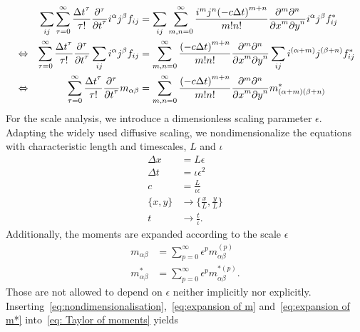 \documentclass{article}
\begin{document}
\begin{align}
    \nonumber
    & & \sum_{ij} \sum_{\tau = 0}^\infty \frac{{\Delta t}^\tau }{\tau!} \frac{\partial^\tau}{{\partial t}^\tau} i^\alpha j^\beta f_{ij} &=
    \sum_{ij}\sum_{m,n = 0}^\infty \frac{i^m j^n {(-c\Delta t)}^{m+n}} {m!n!} \frac{\partial^m \partial^n}{ {\partial x}^m{\partial y}^n}i^\alpha j^\beta f^*_{ij}\\
    \nonumber
    &\Leftrightarrow &
    \sum_{\tau = 0}^\infty \frac{{\Delta t}^\tau }{\tau!} \frac{\partial^\tau}{{\partial t}^\tau} \sum_{ij}i^\alpha j^\beta f_{ij} &=
    \sum_{m,n = 0}^\infty \frac{{(-c\Delta t)}^{m+n}} {m!n!} \frac{\partial^m \partial^n}{ {\partial x}^m{\partial y}^n}\sum_{ij}i^{(\alpha + m)} j^{(\beta+n)} f^*_{ij}\\
      \label{eq: Taylor of moments}
     &\Leftrightarrow &
     \sum_{\tau = 0}^\infty \frac{{\Delta t}^\tau }{\tau!} \frac{\partial^\tau}{{\partial t}^\tau} m_{\alpha\beta} &=
    \sum_{m,n = 0}^\infty \frac{{(-c\Delta t)}^{m+n}} {m!n!} \frac{\partial^m \partial^n}{ {\partial x}^m{\partial y}^n} m^*_{(\alpha + m)(\beta + n)}
\end{align}
For the scale analysis, we introduce a dimensionless scaling parameter $\epsilon$.
Adapting the widely used diffusive scaling, we nondimensionalize the equations with characteristic length and timescales, $L$ and $\iota$
\begin{equation}
  \label{eq:nondimensionalisation}
  \begin{aligned}
    \Delta x & = L\epsilon \\
    \Delta t & = \iota\epsilon^2 \\
    c & = \frac{L}{\iota\epsilon} \\
    \{x, y\} & \rightarrow \{\frac{x}{L}, \frac{y}{L}\} \\
    t & \rightarrow \frac{t}{\iota}.
  \end{aligned}
\end{equation}
Additionally, the moments are expanded according to the scale $\epsilon$
\begin{align}
    \label{eq:expansion of m}
    m_{\alpha\beta} & = \sum_{p=0}^{\infty} \epsilon^p m_{\alpha\beta}^{(p)} \\
    \label{eq:expansion of m*}
    m^*_{\alpha\beta} & = \sum_{p=0}^{\infty} \epsilon^p m_{\alpha\beta}^{*(p)}.
\end{align}
Those are not allowed to depend on $\epsilon$ neither implicitly nor explicitly.
Inserting~\eqref{eq:nondimensionalisation},~\eqref{eq:expansion of m} and~\eqref{eq:expansion of m*} into~\eqref{eq: Taylor of moments} yields
\end{document}
